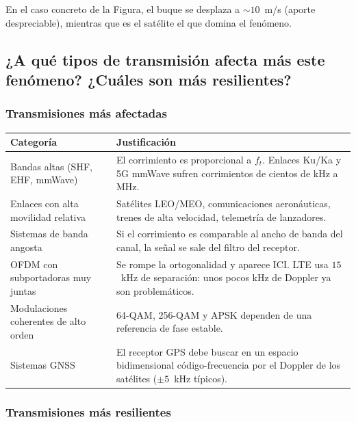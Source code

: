 \documentclass[12pt,a4paper]{article}
\begin{document}
En el caso concreto de la Figura, el buque se desplaza a $\sim 10$~m/s (aporte
despreciable), mientras que es el satélite el que domina el fenómeno.

\subsection{¿A qué tipos de transmisión afecta más este fenómeno? ¿Cuáles son más resilientes?}

\subsubsection*{Transmisiones más afectadas}

\begin{center}
\begin{tabular}{p{} p{}}
\hline
\textbf{Categoría} & \textbf{Justificación} \\
\hline
Bandas altas (SHF, EHF, mmWave) & El corrimiento es proporcional a $f_t$. Enlaces Ku/Ka y 5G mmWave sufren corrimientos de cientos de kHz a MHz. \\
Enlaces con alta movilidad relativa & Satélites LEO/MEO, comunicaciones aeronáuticas, trenes de alta velocidad, telemetría de lanzadores. \\
Sistemas de banda angosta & Si el corrimiento es comparable al ancho de banda del canal, la señal se sale del filtro del receptor. \\
OFDM con subportadoras muy juntas & Se rompe la ortogonalidad y aparece ICI. LTE usa $15$~kHz de separación: unos pocos kHz de Doppler ya son problemáticos. \\
Modulaciones coherentes de alto orden & 64-QAM, 256-QAM y APSK dependen de una referencia de fase estable. \\
Sistemas GNSS & El receptor GPS debe buscar en un espacio bidimensional código-frecuencia por el Doppler de los satélites ($\pm 5$~kHz típicos). \\
\hline
\end{tabular}
\end{center}

\subsubsection*{Transmisiones más resilientes}
\end{document}
